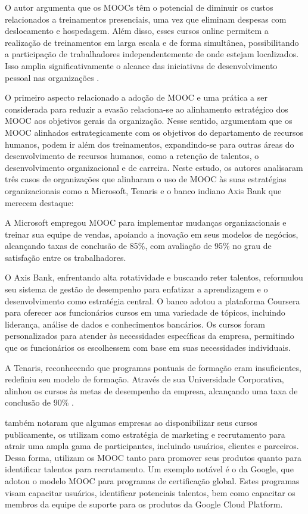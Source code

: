 \documentclass[portuguese]{textolivre}
\begin{document}
O autor argumenta que os MOOCs têm o potencial de diminuir os custos relacionados a treinamentos presenciais, uma vez que eliminam despesas com deslocamento e hospedagem. Além disso, esses cursos online permitem a realização de treinamentos em larga escala e de forma simultânea, possibilitando a participação de trabalhadores independentemente de onde estejam localizados. Isso amplia significativamente o alcance das iniciativas de desenvolvimento pessoal nas organizações \cite{yan_construction_2022}.

O primeiro aspecto relacionado a adoção de MOOC e uma prática a ser considerada para reduzir a evasão relaciona-se ao alinhamento estratégico dos MOOC aos objetivos gerais da organização. Nesse sentido, \textcite{park_moocs_2021} argumentam que os MOOC alinhados estrategicamente com os objetivos do departamento de recursos humanos, podem ir além dos treinamentos, expandindo-se para outras áreas do desenvolvimento de recursos humanos, como a retenção de talentos, o desenvolvimento organizacional e de carreira. Neste estudo, os autores analisaram três casos de organizações que alinharam o uso de MOOC às suas estratégias organizacionais como a Microsoft, Tenaris e o banco indiano Axis Bank que merecem destaque:
 
A Microsoft empregou MOOC para implementar mudanças organizacionais e treinar sua equipe de vendas, apoiando a inovação em seus modelos de negócios, alcançando taxas de conclusão de 85\%, com avaliação de 95\% no grau de satisfação entre os trabalhadores. 

O Axis Bank, enfrentando alta rotatividade e buscando reter talentos, reformulou seu sistema de gestão de desempenho para enfatizar a aprendizagem e o desenvolvimento como estratégia central. O banco adotou a plataforma Coursera para oferecer aos funcionários cursos em uma variedade de tópicos, incluindo liderança, análise de dados e conhecimentos bancários. Os cursos foram personalizados para atender às necessidades específicas da empresa, permitindo que os funcionários os escolhessem com base em suas necessidades individuais.

A Tenaris, reconhecendo que programas pontuais de formação eram insuficientes, redefiniu seu modelo de formação. Através de sua Universidade Corporativa, alinhou os cursos às metas de desempenho da empresa, alcançando uma taxa de conclusão de 90\% \cite{park_moocs_2021}.

\textcite{park_moocs_2021} também notaram que algumas empresas ao disponibilizar seus cursos publicamente, os utilizam como estratégia de marketing e recrutamento para atrair uma ampla gama de participantes, incluindo usuários, clientes e parceiros. Dessa forma, utilizam os MOOC tanto para promover seus produtos quanto para identificar talentos para recrutamento. Um exemplo notável é o da Google, que adotou o modelo MOOC para programas de certificação global. Estes programas visam capacitar usuários, identificar potenciais talentos, bem como capacitar os membros da equipe de suporte para os produtos da Google Cloud Platform. 
\end{document}
